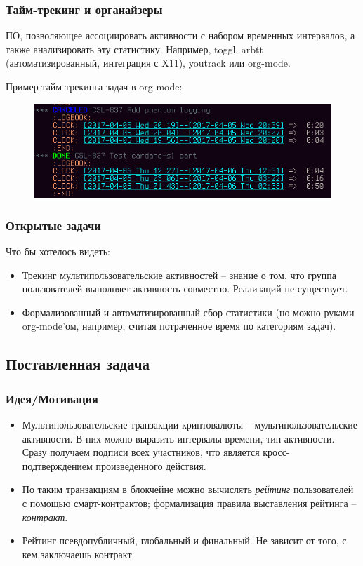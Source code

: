 \documentclass[11pt,handout,pdf,hyperref={unicode}]{beamer}
\begin{document}
\begin{frame}
  \frametitle{Тайм-трекинг и органайзеры}

  ПО, позволяющее ассоциировать активности с набором временных
  интервалов, а также анализировать эту статистику. Например, toggl,
  arbtt (автоматизированный, интеграция с X11), youtrack или org-mode.

  Пример тайм-трекинга задач в org-mode:
  \begin{figure}[t]
  \includegraphics[scale=0.5]{org_mode_task}
  \centering
  \end{figure}
\end{frame}

\begin{frame}
  \frametitle{Открытые задачи}

  Что бы хотелось видеть:
  \begin{itemize}
  \item Трекинг мультипользовательские активностей -- знание о том,
    что группа пользователей выполняет активность
    совместно. Реализаций не существует.
  \item Формализованный и автоматизированный сбор статистики (но можно
    руками org-mode'ом, например, считая потраченное время по
    категориям задач).
  \end{itemize}
\end{frame}

\subsection{Поставленная задача}

\begin{frame}
  \frametitle{Идея/Мотивация}

  \begin{itemize}
  \item Мультипользовательские транзакции криптовалюты --
    мультипользовательские активности. В них можно выразить интервалы
    времени, тип активности. Сразу получаем подписи всех участников,
    что является кросс-подтверждением произведенного действия.
  \item По таким транзакциям в блокчейне можно вычислять
    \textit{рейтинг} пользователей с помощью смарт-контрактов;
    формализация правила выставления рейтинга -- \textit{контракт}.
  \item Рейтинг псевдопубличный, глобальный и финальный. Не зависит от
    того, с кем заключаешь контракт.
  \end{itemize}
\end{frame}
\end{document}
